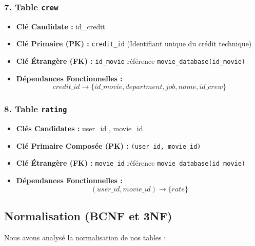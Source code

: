 \documentclass[12pt]{article}
\begin{document}
\subsubsection{7. Table \texttt{crew}}
\begin{itemize}
     \item \textbf{Clé Candidate :} id\_credit
    \item \textbf{Clé Primaire (PK) :} \texttt{credit\_id} (Identifiant unique du crédit technique)
    \item \textbf{Clé Étrangère (FK) :} \texttt{id\_movie} référence \texttt{movie\_database(id\_movie)}
    \item \textbf{Dépendances Fonctionnelles :}
    \[ credit\_id \rightarrow \{ id\_movie, department, job, name, id\_crew \} \]
\end{itemize}

\subsubsection{8. Table \texttt{rating}}
\begin{itemize}
     \item \textbf{Clés Candidates :} user\_id , movie\_id.
    \item \textbf{Clé Primaire Composée (PK) :} \texttt{(user\_id, movie\_id)}
    \item \textbf{Clé Étrangère (FK) :} \texttt{movie\_id} référence \texttt{movie\_database(id\_movie)}
    \item \textbf{Dépendances Fonctionnelles :}
    \[ (user\_id, movie\_id) \rightarrow \{ rate \} \]
\end{itemize}

\newpage
\subsection{Normalisation (BCNF et 3NF)}

Nous avons analysé la normalisation de nos tables :
\end{document}
